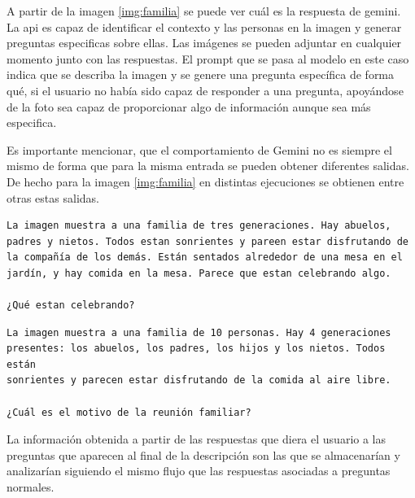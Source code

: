A partir de la imagen \ref{img:familia} se puede ver cuál es la respuesta de gemini. La api es capaz de identificar el contexto y las personas en la imagen y generar preguntas especificas sobre ellas. Las imágenes se pueden adjuntar en cualquier momento junto con las respuestas. El prompt que se pasa al modelo en este caso indica que se describa la imagen y se genere una pregunta específica de forma qué, si el usuario no había sido capaz de responder a una pregunta, apoyándose de la foto sea capaz de proporcionar algo de información aunque sea más especifica. 

Es importante mencionar, que el comportamiento de Gemini no es siempre el mismo de forma que para la misma entrada se pueden obtener diferentes salidas. De hecho para la imagen \ref{img:familia} en distintas ejecuciones se obtienen entre otras estas salidas. 

\begin{verbatim}
La imagen muestra a una familia de tres generaciones. Hay abuelos,
padres y nietos. Todos estan sonrientes y pareen estar disfrutando de
la compañía de los demás. Están sentados alrededor de una mesa en el
jardín, y hay comida en la mesa. Parece que estan celebrando algo. 
   
¿Qué estan celebrando? 
\end{verbatim}

\begin{verbatim}
La imagen muestra a una familia de 10 personas. Hay 4 generaciones
presentes: los abuelos, los padres, los hijos y los nietos. Todos están
sonrientes y parecen estar disfrutando de la comida al aire libre. 

¿Cuál es el motivo de la reunión familiar?  
\end{verbatim}

La información obtenida a partir de las respuestas que diera el usuario a las preguntas que aparecen al final de la descripción son las que se almacenarían y analizarían siguiendo el mismo flujo que las respuestas asociadas a preguntas normales. 
